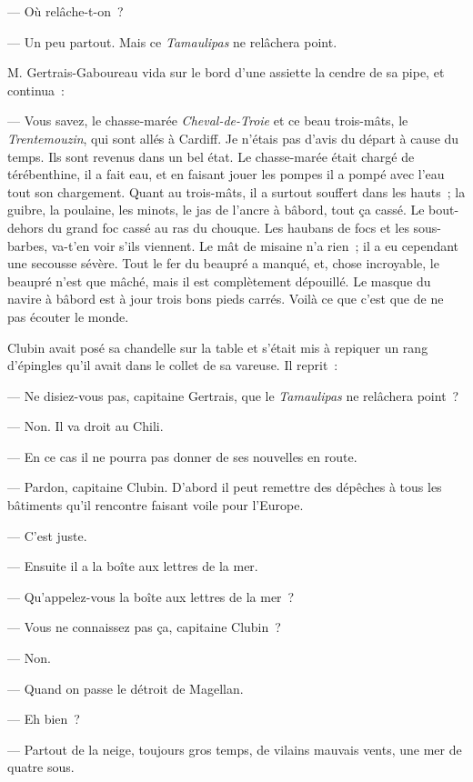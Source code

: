 \documentclass[french,twoside]{book} %
\begin{document}
— Où relâche-t-on ?\par
— Un peu partout. Mais ce \emph{Tamaulipas} ne relâchera point.\par
M. Gertrais-Gaboureau vida sur le bord d’une assiette la cendre de sa pipe, et continua :\par
— Vous savez, le chasse-marée \emph{Cheval-de-Troie} et ce beau trois-mâts, le \emph{Trentemouzin}, qui sont allés à Cardiff. Je n’étais pas d’avis du départ à cause du temps. Ils sont revenus dans un bel état. Le chasse-marée était chargé de térébenthine, il a fait eau, et en faisant jouer les pompes il a pompé avec l’eau tout son chargement. Quant au trois-mâts, il a surtout souffert dans les hauts ; la guibre, la poulaine, les minots, le  jas de l’ancre à bâbord, tout ça cassé. Le bout-dehors du grand foc cassé au ras du chouque. Les haubans de focs et les sous-barbes, va-t’en voir s’ils viennent. Le mât de misaine n’a rien ; il a eu cependant une secousse sévère. Tout le fer du beaupré a manqué, et, chose incroyable, le beaupré n’est que mâché, mais il est complètement dépouillé. Le masque du navire à bâbord est à jour trois bons pieds carrés. Voilà ce que c’est que de ne pas écouter le monde.\par
Clubin avait posé sa chandelle sur la table et s’était mis à repiquer un rang d’épingles qu’il avait dans le collet de sa vareuse. Il reprit :\par
— Ne disiez-vous pas, capitaine Gertrais, que le \emph{Tamaulipas} ne relâchera point ?\par
— Non. Il va droit au Chili.\par
— En ce cas il ne pourra pas donner de ses nouvelles en route.\par
— Pardon, capitaine Clubin. D’abord il peut remettre des dépêches à tous les bâtiments qu’il rencontre faisant voile pour l’Europe.\par
— C’est juste.\par
— Ensuite il a la boîte aux lettres de la mer.\par
— Qu’appelez-vous la boîte aux lettres de la mer ?\par
— Vous ne connaissez pas ça, capitaine Clubin ?\par
— Non.\par
— Quand on passe le détroit de Magellan.\par
— Eh bien ?\par
— Partout de la neige, toujours gros temps, de vilains mauvais vents, une mer de quatre sous.\par
\end{document}
